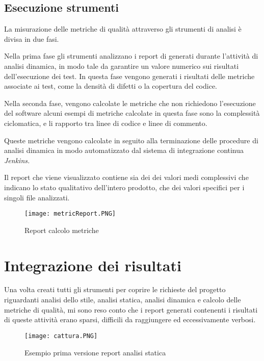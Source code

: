 \subsection{Esecuzione strumenti}

La misurazione delle metriche di qualità attraverso gli strumenti di analisi è divisa in due fasi. 

Nella prima fase gli strumenti analizzano i report di generati durante l'attività di analisi dinamica, in modo tale da garantire un valore numerico sui risultati dell'esecuzione dei test. In questa fase vengono generati i risultati delle metriche associate ai test, come la densità di difetti o la copertura del codice.

Nella seconda fase, vengono calcolate le metriche che non richiedono l'esecuzione del software alcuni esempi di metriche calcolate in questa fase sono la complessità ciclomatica, e li rapporto tra linee di codice e linee di commento.

Queste metriche vengono calcolate in seguito alla terminazione delle procedure di analisi dinamica in modo automatizzato dal sistema di integrazione continua \textit{Jenkins.}

Il report che viene visualizzato contiene  sia dei dei valori medi complessivi che indicano lo stato qualitativo dell'intero prodotto, che dei valori specifici per i singoli file analizzati.

\begin{figure}[H]
  \centering
  \texttt{[image: metricReport.PNG]}
  \caption{Report calcolo metriche}
\end{figure}


\section{Integrazione dei risultati}
Una volta creati tutti gli strumenti per coprire le richieste del progetto riguardanti analisi dello stile, analisi statica, analisi dinamica e calcolo delle metriche di qualità, mi sono reso conto che i report generati contenenti i risultati di queste attività erano sparsi, difficili da raggiungere ed eccessivamente verbosi.

\begin{figure}[H]
  \centering
  \texttt{[image: cattura.PNG]}
  \caption{Esempio prima versione report analisi statica}
\end{figure}

